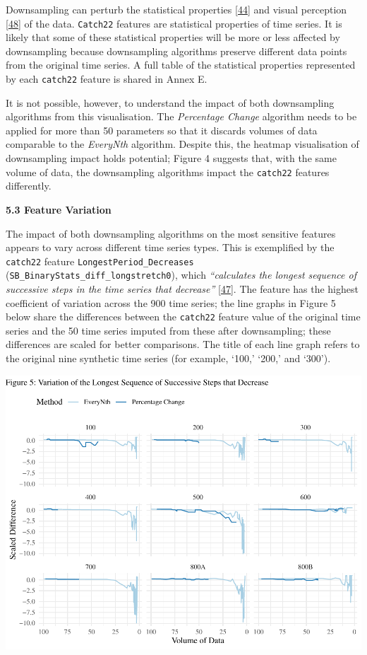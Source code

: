 \documentclass{article}
\begin{document}
Downsampling can perturb the statistical properties
\protect\hyperlink{ref-ATIChangePoint}{{[}44{]}} and visual perception
\protect\hyperlink{ref-graphsampling}{{[}48{]}} of the data.
\texttt{Catch22} features are statistical properties of time series. It
is likely that some of these statistical properties will be more or less
affected by downsampling because downsampling algorithms preserve
different data points from the original time series. A full table of the
statistical properties represented by each \texttt{catch22} feature is
shared in Annex E.

It is not possible, however, to understand the impact of both
downsampling algorithms from this visualisation. The \emph{Percentage
Change} algorithm needs to be applied for more than 50 parameters so
that it discards volumes of data comparable to the \emph{EveryNth}
algorithm. Despite this, the heatmap visualisation of downsampling
impact holds potential; Figure 4 suggests that, with the same volume of
data, the downsampling algorithms impact the \texttt{catch22} features
differently.

\textbf{5.3 Feature Variation}

The impact of both downsampling algorithms on the most sensitive
features appears to vary across different time series types. This is
exemplified by the \texttt{catch22} feature
\texttt{LongestPeriod\_Decreases}
(\texttt{SB\_BinaryStats\_diff\_longstretch0}), which \emph{``calculates
the longest sequence of successive steps in the time series that
decrease''} \protect\hyperlink{ref-feature_book}{{[}47{]}}. The feature
has the highest coefficient of variation across the 900 time series; the
line graphs in Figure 5 below share the differences between the
\texttt{catch22} feature value of the original time series and the 50
time series imputed from these after downsampling; these differences are
scaled for better comparisons. The title of each line graph refers to
the original nine synthetic time series (for example, `100,' `200,' and
`300').

\includegraphics{210431461_CSC8639_Dissertation_files/figure-latex/LongestDecreases-1.pdf}
\end{document}
